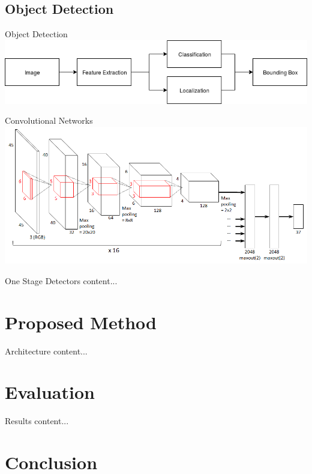 \documentclass{beamer}
\begin{document}
\begin{darkframes}
    \subsection{Object Detection}
    \begin{frame}{Object Detection}
    	\includegraphics[width=\linewidth]{resources/ObjectDetection}
    \end{frame}
    \begin{frame}{Convolutional Networks}
	\includegraphics[width=\linewidth]{resources/cnn}
    \end{frame}
    \begin{frame}{One Stage Detectors}
       	content...
    \end{frame}

        
    \section{Proposed Method}
    \begin{frame}{Architecture}
    	content...
    \end{frame}
    
    \section{Evaluation}
    \begin{frame}{Results}
    	content...
    \end{frame}
    
    \section{Conclusion}

\end{darkframes}
\end{document}
